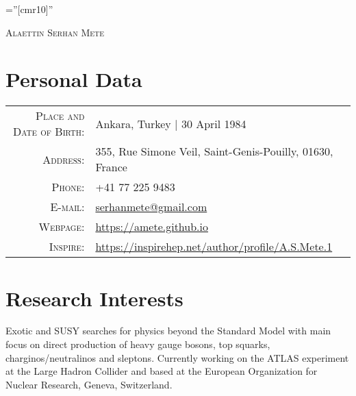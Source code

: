 \documentclass[a4paper,10pt]{article}
\begin{document}

\pagestyle{empty} %

\font\fb=''[cmr10]'' %

\par{\centering
		{\Huge \textsc{Alaettin Serhan Mete}
	}\bigskip\par}

\section{Personal Data}

\begin{tabular}{rl}
    \textsc{Place and Date of Birth:} 			& Ankara, Turkey  | 30 April 1984 							\\
    \textsc{Address:}   					& 355, Rue Simone Veil, Saint-Genis-Pouilly, 01630, France		\\
    \textsc{Phone:}     						& +41 77 225 9483										\\
    \textsc{E-mail:}     						& \href{mailto:serhanmete@gmail.com}{serhanmete@gmail.com}	\\
    \textsc{Webpage:}						& \href{https://amete.github.io}{https://amete.github.io} 			\\
    \textsc{Inspire:}						& \href{https://inspirehep.net/author/profile/A.S.Mete.1}{https://inspirehep.net/author/profile/A.S.Mete.1}
\end{tabular}

\vspace{3mm}
\section{Research Interests}
Exotic and SUSY searches for physics beyond the Standard Model with main focus on direct production of 
heavy gauge bosons, top squarks, charginos/neutralinos and sleptons. 
Currently working on the ATLAS experiment at the Large Hadron Collider and based at 
the European Organization for Nuclear Research, Geneva, Switzerland.
\end{document}
